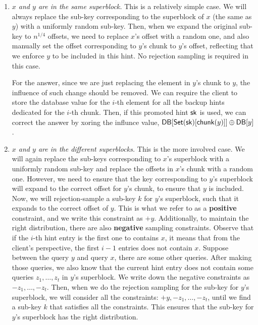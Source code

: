 \begin{enumerate}
    \item \textit{$x$ and $y$ are in the same superblock.} This is a relatively
    simple case. We will always replace the sub-key corresponding to the
    superblock of $x$ (the same as $y$) with a uniformly random sub-key. Then,
    when we expand the original sub-key to $n^{1/4}$ offsets, we need to replace
    $x$'s offset with a random one, and also manually set the offset
    corresponding to $y$'s chunk to $y$'s offset, reflecting that we enforce $y$
    to be included in this hint. No rejection sampling is required in this case.
    
    For the answer, since we are just replacing the element in $y$'s chunk to
    $y$, the influence of such change should be removed. We can require the
    client to store the database value for the $i$-th element for all the backup
    hints dedicated for the $i$-th chunk. Then, if this promoted hint $\mathsf{sk}$ is
    used, we can correct the answer by xoring the influnce value,
    $\mathsf{DB}[\mathsf{Set}(\mathsf{sk})[\mathsf{chunk}(y)]]\oplus\mathsf{DB}[y]$.
    
    \item \textit{$x$ and $y$ are in the different superblocks.} This is the
    more involved case. We will again replace the sub-keys corresponding to
    $x$'s superblock with a uniformly random sub-key and replace the offsets in
    $x$'s chunk with a random one. However, we need to ensure that the key
    corresponding to $y$'s superblock will expand to the correct offset for
    $y$'s chunk, to ensure that $y$ is included. Now, we will rejection-sample a
    sub-key $k$ for $y$'s superblock, such that it expands to the correct offset
    of $y$. This is what we refer to as a \textbf{positive} constraint, and we
    write this constraint as $+y$.
    Additionally, to maintain the right distribution, there are also
    \textbf{negative} sampling constraints. Observe that if the $i$-th hint
    entry is the first one to contains $x$, it means that from the client's
    perspective, the first $i-1$ entries does not contain $x$. Suppose between
    the query $y$ and query $x$, there are some other queries. After making
    those queries, we also know that the current hint entry does not contain
    some queries $z_1,\dots,z_t$ in $y$'s superblock. We write down the negative
    constraints as $-z_1,\dots,-z_t$. Then, when we do the rejection sampling
    for the sub-key for $y$'s superblock, we will consider all the constraints:
    $+y, -z_1,\dots,-z_t$, until we find a sub-key $k$ that satisfies all the
    constraints. This ensures that the sub-key for $y$'s superblock has the
    right distribution.
    

\end{enumerate}
